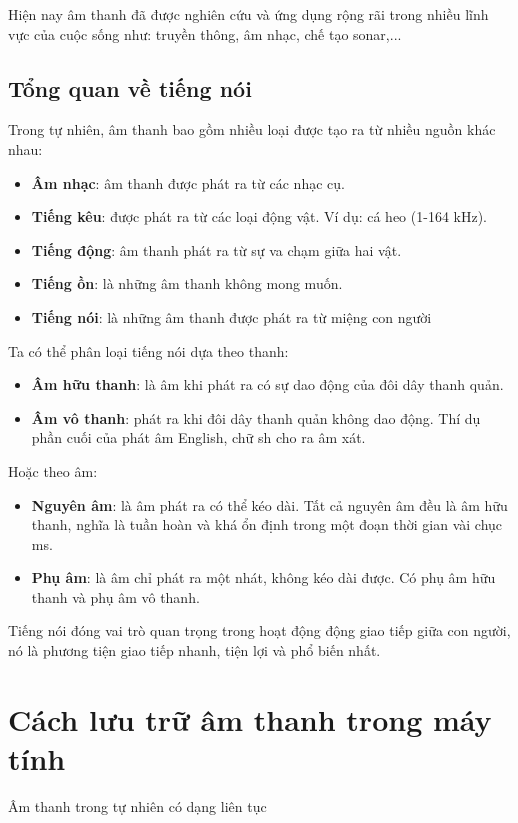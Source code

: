 Hiện nay âm thanh đã được nghiên cứu và ứng dụng rộng rãi trong nhiều lĩnh vực của cuộc sống như: truyền thông, âm nhạc, chế tạo sonar,...

\subsection{Tổng quan về tiếng nói}
Trong tự nhiên, âm thanh bao gồm nhiều loại được tạo ra từ nhiều nguồn khác nhau: 
\begin{itemize}
	\item \textbf{Âm nhạc}: âm thanh được phát ra từ các nhạc cụ.
	\item \textbf{Tiếng kêu}: được phát ra từ các loại động vật. Ví dụ: cá heo (1-164 kHz).
	\item \textbf{Tiếng động}: âm thanh phát ra từ sự va chạm giữa hai vật.
	\item \textbf{Tiếng ồn}: là những âm thanh không mong muốn.
	\item \textbf{Tiếng nói}: là những âm thanh được phát ra từ miệng con người
\end{itemize}

\noindent Ta có thể phân loại tiếng nói dựa theo thanh:
\begin{itemize}
	\item \textbf{Âm hữu thanh}: là âm khi phát ra có sự dao động của đôi dây thanh quản.
	\item \textbf{Âm vô thanh}: phát ra khi đôi dây thanh quản không dao động. Thí dụ phần cuối của phát âm English, chữ sh cho ra âm xát.
\end{itemize}

\noindent Hoặc theo âm:
\begin{itemize}
	\item \textbf{Nguyên âm}: là âm phát ra có thể kéo dài. Tất cả nguyên âm đều là âm hữu thanh, nghĩa là tuần hoàn và khá ổn định trong một đoạn thời gian vài chục ms.
	\item \textbf{Phụ âm}: là âm chỉ phát ra một nhát, không kéo dài được. Có phụ âm hữu thanh và phụ âm vô thanh.
\end{itemize}

Tiếng nói đóng vai trò quan trọng trong hoạt động động giao tiếp giữa con người, nó là phương tiện giao tiếp nhanh, tiện lợi và phổ biến nhất.

\section{Cách lưu trữ âm thanh trong máy tính}
Âm thanh trong tự nhiên có dạng liên tục 

